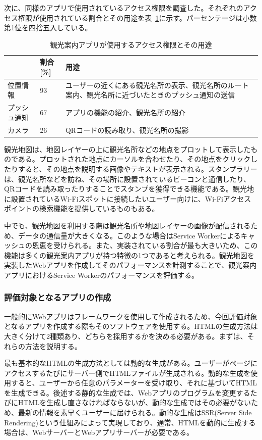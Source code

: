 次に、同様のアプリで使用されているアクセス権限を調査した。それぞれのアクセス権限が使用されている割合とその用途を表~\ref{table:観光案内アプリが使用するアクセス権限とその用途}に示す。パーセンテージは小数第1位を四捨五入している。

\begin{table}
  \caption{観光案内アプリが使用するアクセス権限とその用途}
  \label{table:観光案内アプリが使用するアクセス権限とその用途}
  \centering
  \begin{tabular}{|p{10em}|p{5em}|p{15em}|}
    \hline
    & 割合[\%] & 用途 \\ \hline
    位置情報 & 93 & ユーザーの近くにある観光名所の表示、観光名所のルート案内、観光名所に近づいたときのプッシュ通知の送信 \\ \hline
    プッシュ通知 & 67 & アプリの機能の紹介、観光名所の紹介 \\ \hline
    カメラ & 26 & QRコードの読み取り、観光名所の撮影 \\ \hline
  \end{tabular}
\end{table}
観光地図は、地図レイヤーの上に観光名所などの地点をプロットして表示したものである。プロットされた地点にカーソルを合わせたり、その地点をクリックしたりすると、その地点を説明する画像やテキストが表示される。スタンプラリーは、観光名所などを訪ね、その場所に設置されているビーコンと通信したり、QRコードを読み取ったりすることでスタンプを獲得できる機能である。観光地に設置されているWi-Fiスポットに接続したいユーザー向けに、Wi-Fiアクセスポイントの検索機能を提供しているものもある。

中でも、観光地図を利用する際は観光名所や地図レイヤーの画像が配信されるため、データの通信量が大きくなる。このような場合はService Workerによるキャッシュの恩恵を受けられる。また、実装されている割合が最も大きいため、この機能は多くの観光案内アプリが持つ特徴の1つであると考えられる。観光地図を実装したWebアプリを作成してそのパフォーマンスを計測することで、観光案内アプリにおけるService Workerのパフォーマンスを評価する。
\subsubsection{評価対象となるアプリの作成}
\label{subsubsection:評価対象となるアプリの作成}
一般的にWebアプリはフレームワークを使用して作成されるため、今回評価対象となるアプリを作成する際もそのソフトウェアを使用する。HTMLの生成方法は大きく分けて2種類あり、どちらを採用するかを決める必要がある。まずは、それらの方法を説明する。

最も基本的なHTMLの生成方法としては動的な生成がある。ユーザーがページにアクセスするたびにサーバー側でHTMLファイルが生成される。動的な生成を使用すると、ユーザーから任意のパラメーターを受け取り、それに基づいてHTMLを生成できる。後述する静的な生成では、Webアプリのプログラムを変更するたびにHTMLを生成し直さなければならないが、動的な生成ではその必要がないため、最新の情報を素早くユーザーに届けられる。動的な生成はSSR(Server Side Rendering)という仕組みによって実現しており、通常、HTMLを動的に生成する場合は、WebサーバーとWebアプリサーバーが必要である。

